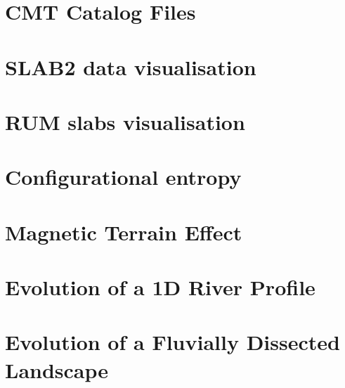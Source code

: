 \documentclass[a4paper,11pt]{report}
\begin{document}
\chapter{CMT Catalog Files\label{f134}} %

\chapter{SLAB2 data visualisation\label{f135}} %

\chapter{RUM slabs visualisation\label{f136}} %

\chapter{Configurational entropy \label{f137}} %

\chapter{Magnetic Terrain Effect \label{f138}} %

\chapter{Evolution of a 1D River Profile\label{f139}} %

\chapter{Evolution of a Fluvially Dissected Landscape \label{f140}} %
\end{document}
